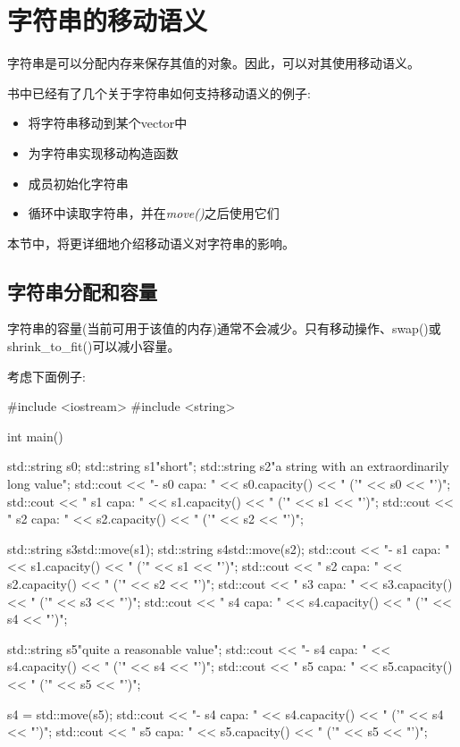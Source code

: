 \section{字符串的移动语义}
字符串是可以分配内存来保存其值的对象。因此，可以对其使用移动语义。

书中已经有了几个关于字符串如何支持移动语义的例子:

\begin{itemize}
	\item 将字符串移动到某个vector中
	\item 为字符串实现移动构造函数
	\item 成员初始化字符串
	\item 循环中读取字符串，并在\textit{move()}之后使用它们
\end{itemize}

本节中，将更详细地介绍移动语义对字符串的影响。

\subsection{字符串分配和容量}

字符串的容量(当前可用于该值的内存)通常不会减少。只有移动操作、swap()或shrink_to_fit()可以减小容量。

考虑下面例子:

\begin{cppcode}
#include <iostream>
#include <string>

int main()
{
	std::string s0;
	std::string s1{"short"};
	std::string s2{"a string with an extraordinarily long value"};
	std::cout << "- s0 capa: " << s0.capacity() << " ('" << s0 << "')\n";
	std::cout << " s1 capa: " << s1.capacity() << " ('" << s1 << "')\n";
	std::cout << " s2 capa: " << s2.capacity() << " ('" << s2 << "')\n";

	std::string s3{std::move(s1)};
	std::string s4{std::move(s2)};
	std::cout << "- s1 capa: " << s1.capacity() << " ('" << s1 << "')\n";
	std::cout << " s2 capa: " << s2.capacity() << " ('" << s2 << "')\n";
	std::cout << " s3 capa: " << s3.capacity() << " ('" << s3 << "')\n";
	std::cout << " s4 capa: " << s4.capacity() << " ('" << s4 << "')\n";

	std::string s5{"quite a reasonable value"};
	std::cout << "- s4 capa: " << s4.capacity() << " ('" << s4 << "')\n";
	std::cout << " s5 capa: " << s5.capacity() << " ('" << s5 << "')\n";

	s4 = std::move(s5);
	std::cout << "- s4 capa: " << s4.capacity() << " ('" << s4 << "')\n";
	std::cout << " s5 capa: " << s5.capacity() << " ('" << s5 << "')\n";
}
\end{cppcode}

